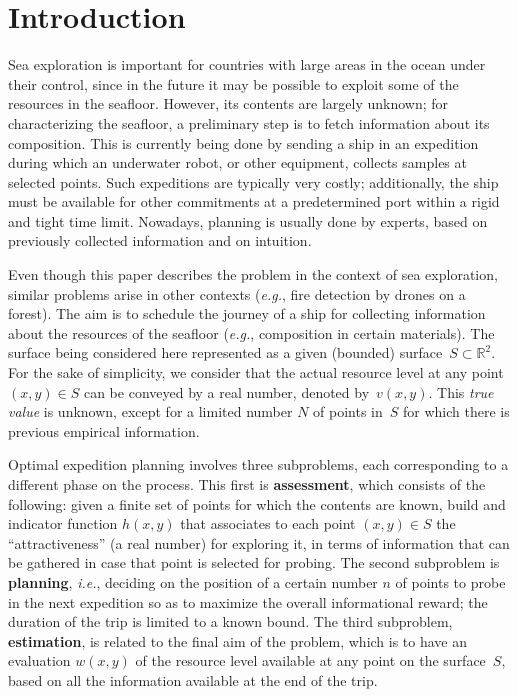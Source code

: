\documentclass[smallextended]{svjour3}
\newcommand{\ie}{\emph{i.e.}}
\newcommand{\eg}{\emph{e.g.}}
\begin{document}
\section{Introduction}
\label{sec:introd}

Sea exploration is important for countries with large areas in the ocean under their control, since in the future it may be possible to exploit some of the resources in the seafloor.  However, its contents are largely unknown; for characterizing the seafloor, a preliminary step is to fetch information about its composition.  This is currently being done by sending a ship in an expedition during which an underwater robot, or other equipment, collects samples at selected points.  Such expeditions are typically very costly; additionally, the ship must be available for other commitments at a predetermined port within a rigid and tight time limit.  Nowadays, planning is usually done by experts, based on previously collected information and on intuition.

Even though this paper describes the problem in the context of sea exploration, similar problems arise in other contexts (\eg, fire detection by drones on a forest).  The aim is to schedule the journey of a ship for collecting information about the resources of the seafloor (\eg, composition in certain materials).  The surface being considered here represented as a given (bounded) surface~$S\subset\mathbb{R}^2$.  For the sake of simplicity, we consider that the actual resource level at any point $(x,y) \in S$ can be conveyed by a real number, denoted by~$v(x,y)$.  This \emph{true value} is unknown, except for a limited number $N$ of points in~$S$ for which there is previous empirical information.

Optimal expedition planning involves three subproblems, each corresponding to a different phase on the process.
This first is \textbf{assessment}, which consists of the following: given a finite set of points for which the contents are known, build and indicator function $h(x,y)$ that associates to each point $(x,y) \in S$ the ``attractiveness'' (a real number) for exploring it, in terms of information that can be gathered in case that point is selected for probing.  
The second subproblem is \textbf{planning}, \ie, deciding on the position of a certain number $n$ of points to probe in the next expedition so as to maximize the overall informational reward; the duration of the trip is limited to a known bound. 
The third subproblem, \textbf{estimation}, is related to the final aim of the problem, which is to have an evaluation $w(x,y)$ of the resource level available at any point on the surface~$S$, based on all the information available at the end of the trip.
\end{document}
